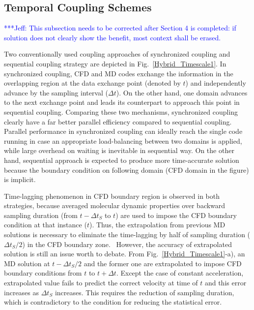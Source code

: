 \documentclass[preprint,12pt]{elsarticle}
\newcommand{\skonote}[1]{ {\textcolor{blue} { ***Jeff: #1 }}}
\newcommand{\skonote}[1]{}
\begin{document}
\subsection{Temporal Coupling Schemes}


\skonote{This subsection needs to be corrected after Section 4 is completed: if solution does not clearly show the benefit, most context shall be erased.}

Two conventionally used coupling approaches of synchronized coupling and sequential coupling strategy are depicted in Fig.~\ref{Hybrid_Timescale1}. In synchronized coupling, CFD and MD codes exchange the information in the overlapping region at the data exchange point (denoted by $t$) and independently advance by the sampling interval (${\Delta}t$). On the other hand, one domain advances to the next exchange point and leads its counterpart to approach this point in sequential coupling. Comparing these two mechanisms, synchronized coupling clearly have a far better parallel efficiency compared to sequential coupling.~\cite{Time_Mechanism} Parallel performance in synchronized coupling can ideally reach the single code running in case an appropriate load-balancing between two domains is applied, while large overhead on waiting is inevitable in sequential way. On the other hand, sequential approach is expected to produce more time-accurate solution because the boundary condition on following domain (CFD domain in the figure) is implicit. 

Time-lagging phenomenon in CFD boundary region is observed in both strategies, because averaged molecular dynamic properties over backward sampling duration (from $t-{\Delta}t_S$ to $t$) are used to impose the CFD boundary condition at that instance ($t$). Thus,  the extrapolation from previous MD solutions is necessary to eliminate the time-lagging by half of sampling duration (${\Delta}t_{S}/{2}$) in the CFD boundary zone.~\cite{Wang} However, the accuracy of extrapolated solution is still an issue worth to debate. From Fig.~\ref{Hybrid_Timescale1}-a), an MD solution at $t-{\Delta}t_{S}/{2}$ and the former one are extrapolated to impose CFD boundary conditions from $t$ to $t+\Delta{t}$. Except the case of constant acceleration, extrapolated value fails to predict the correct velocity at time of $t$ and this error increases as $\Delta{t}_S$ increases. This requires the reduction of sampling duration, which is contradictory to the condition for reducing the statistical error.

\end{document}
